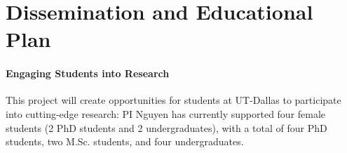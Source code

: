 \section{Dissemination and Educational Plan}
\label{edu}

\paragraph{Engaging Students into Research}

This project will create opportunities for students at UT-Dallas to
participate into cutting-edge research: PI Nguyen has currently supported
four female students (2 PhD students and 2 undergraduates), with a total
of four PhD students, two M.Sc. students, and four undergraduates.



%

